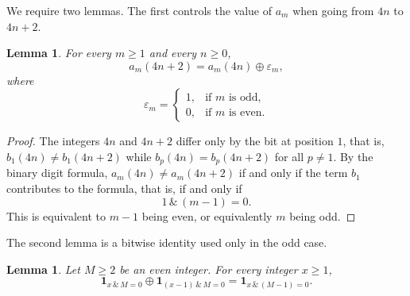 \documentclass[12pt,reqno]{article}
\theoremstyle{plain}
\newtheorem{lemma}[theorem]{Lemma}
\theoremstyle{definition}
\begin{document}
We require two lemmas. The first controls the value of $a_m$ when going from $4n$ to $4n+2$.

\begin{lemma}
\label{lem:am-4n2}
For every $m\ge 1$ and every $n\ge 0$,
\[
  a_m(4n+2)=a_m(4n)\oplus \varepsilon_m,
\]
where
\[
  \varepsilon_m=
  \begin{cases}
  1, & \text{if } m \text{ is odd},\\
  0, & \text{if } m \text{ is even}.
  \end{cases}
\]
\end{lemma}

\begin{proof}
The integers $4n$ and $4n+2$ differ only by the bit at position $1$, that is, $b_1(4n) \neq b_1(4n+2)$ while $b_p(4n) = b_p(4n+2)$ for all $p \neq 1$. By the binary digit formula, $a_m(4n) \neq a_m(4n+2)$ if and only if the term $b_1$ contributes to the formula, that is, if and only if
\[
  1\,\&\,(m-1)=0.
\]
This is equivalent to $m-1$ being even, or equivalently $m$ being odd.
\end{proof}

The second lemma is a bitwise identity used only in the odd case.

\begin{lemma}
\label{lem:mask-even-shift}
Let $M\ge 2$ be an even integer. For every integer $x\ge 1$,
\[
\mathbf{1}_{x\,\&\,M=0}
\oplus
\mathbf{1}_{(x-1)\,\&\,M=0}
=
\mathbf{1}_{x\,\&\,(M-1)=0}.
\]
\end{lemma}
\end{document}
